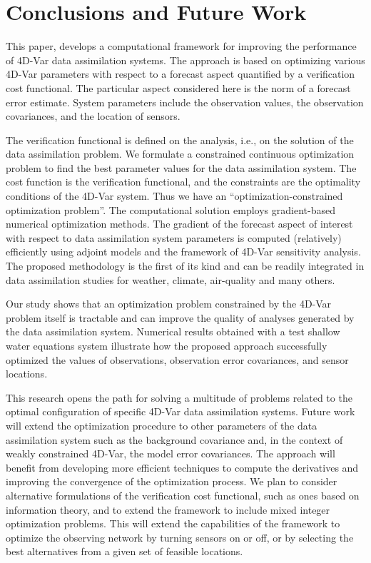\documentclass{article}
\begin{document}
\section{Conclusions and Future Work}\label{sec:optobs_concl}


This paper, develops a computational framework for improving the performance of
4D-Var data assimilation systems. The approach is based on
optimizing various  4D-Var parameters with respect to a forecast aspect quantified by 
a verification cost functional. The particular aspect considered here is the norm of a forecast error
estimate. System parameters include the observation values, the observation covariances, and the location of
sensors.

The verification functional is defined on the analysis, i.e., on the solution of the data assimilation problem.
We formulate a constrained continuous optimization problem to find the best parameter values
for the data assimilation system. The cost function is the verification functional,
and the constraints are the optimality conditions of the 4D-Var system. Thus we have an
``optimization-constrained optimization problem''.
The computational solution employs gradient-based numerical optimization methods.
The gradient of the forecast aspect of interest with respect to data assimilation system parameters
is computed (relatively) efficiently using adjoint models and the framework of 4D-Var sensitivity analysis. 
The proposed methodology is the first of its kind and can be readily integrated in 
data assimilation studies for weather, climate, air-quality and many others.

Our study shows that an optimization problem constrained by the 4D-Var problem itself is tractable
and can improve the quality of analyses generated by the data assimilation system.
Numerical results obtained with a test shallow water equations system illustrate how
the proposed approach successfully optimized the values 
of observations, observation error covariances, and sensor locations.

This research opens the path for solving a multitude of problems related to the
optimal configuration of specific 4D-Var data assimilation systems. 
Future work will extend the optimization procedure to other parameters of the data assimilation system
such as the background covariance and, in the context of weakly constrained 4D-Var, the model error
covariances. The approach will benefit from developing more efficient techniques
to compute the derivatives and improving the convergence of the optimization process.
We plan to consider alternative formulations of the verification cost functional, such as ones based
on information theory, and to extend the framework to include mixed integer optimization problems.
This will extend the capabilities of the framework to optimize the observing network by turning sensors on or off,
or by selecting the best alternatives from a given set of feasible locations.
\end{document}
